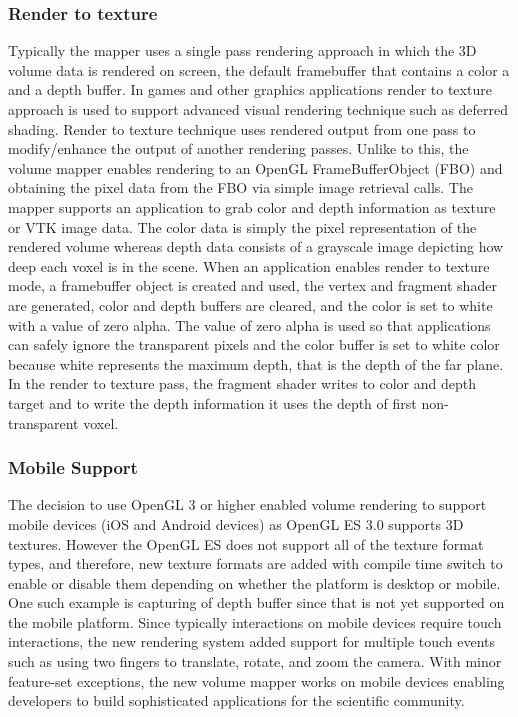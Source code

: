\subsubsection{Render to texture}
Typically the mapper uses a single pass rendering approach in which the 3D volume data is rendered on screen, the default framebuffer that contains a color a and a depth buffer. In games and other graphics applications render to texture approach is used to support advanced visual rendering technique such as deferred shading. Render to texture technique uses rendered output from one pass to modify/enhance the output of another rendering passes. Unlike to this, the volume mapper enables rendering to an OpenGL FrameBufferObject (FBO) and obtaining the pixel data from the FBO via simple image retrieval calls. The mapper supports an application to grab color and depth information as texture or VTK image data. The color data is simply the pixel representation of the rendered volume whereas depth data consists of a grayscale image depicting how deep each voxel is in the scene. When an application enables render to texture mode, a framebuffer object is created and used, the vertex and fragment shader are generated, color and depth buffers are cleared, and the color is set to white with a value of zero alpha. The value of zero alpha is used so that applications can safely ignore the transparent pixels and the color buffer is set to white color because white represents the maximum depth, that is the depth of the far plane. In the render to texture pass, the fragment shader writes to color and depth target and to write the depth information it uses the depth of first non-transparent voxel.

\subsubsection{Mobile Support}
The decision to use OpenGL 3 or higher enabled volume rendering to support mobile devices (iOS and Android devices) as OpenGL ES 3.0 supports 3D textures. However the OpenGL ES does not support all of the texture format types, and therefore, new texture formats are added with compile time switch to enable or disable them depending on whether the platform is desktop or mobile. One such example is capturing of depth buffer since that is not yet supported on the mobile platform.  Since typically interactions on mobile devices require touch interactions, the new rendering system added support for multiple touch events such as using two fingers to translate, rotate, and zoom the camera. With minor feature-set exceptions, the new volume mapper works on mobile devices enabling developers to build sophisticated applications for the scientific community.

